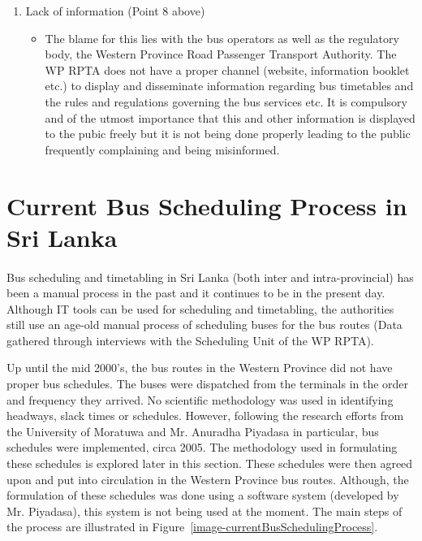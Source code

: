 \documentclass[12pt, oneside]{report}
\begin{document}
\begin {enumerate}
\begin {itemize}
\end {itemize}
\item Lack of information (Point 8 above)
\begin {itemize}
\item The blame for this lies with the bus operators as well as the regulatory body, the Western Province Road Passenger Transport Authority. The WP RPTA does not have a proper channel (website, information booklet etc.) to display and disseminate information regarding bus timetables and the rules and regulations governing the bus services etc. It is compulsory and of the utmost importance that this and other information is displayed to the pubic freely but it is not being done properly leading to the public frequently complaining and being misinformed.
\end {itemize}
\end {enumerate}

\newpage

\section{Current Bus Scheduling Process in Sri Lanka}
\label{section-CurrentBusSchedulingProcessInSriLanka}

\paragraph{ } Bus scheduling and timetabling in Sri Lanka (both inter and intra-provincial) has been a manual process in the past and it continues to be in the present day. Although IT tools can be used for scheduling and timetabling, the authorities still use an age-old manual process of scheduling buses for the bus routes (Data gathered through interviews with the Scheduling Unit of the WP RPTA).

Up until the mid 2000’s, the bus routes in the Western Province did not have proper bus schedules. The buses were dispatched from the terminals in the order and frequency they arrived. No scientific methodology was used in identifying headways, slack times or schedules. However, following the research efforts from the University of Moratuwa and Mr. Anuradha Piyadasa in particular, bus schedules were implemented, circa 2005. The methodology used in formulating these schedules is explored later in this section. These schedules were then agreed upon and put into circulation in the Western Province bus routes. Although, the formulation of these schedules was done using a software system (developed by Mr. Piyadasa), this system is not being used at the moment. The main steps of the process are illustrated in Figure~\ref{image-currentBusSchedulingProcess}.
\end{document}
